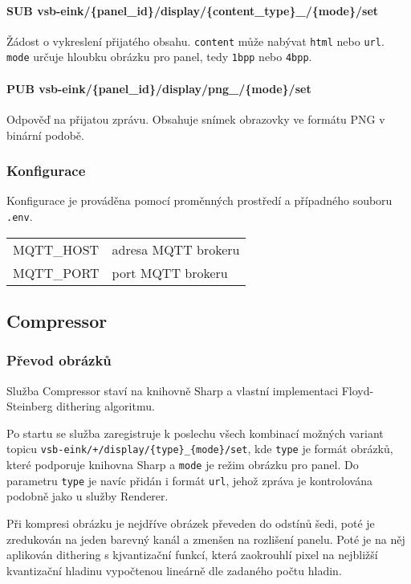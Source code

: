 \paragraph*{SUB vsb-eink/\{panel\_id\}/display/\{content\_type\}\_/\{mode\}/set} Žádost o vykreslení přijatého obsahu. \lstinline|content| může nabývat \lstinline|html| nebo \lstinline|url|. \lstinline|mode| určuje hloubku obrázku pro panel, tedy \lstinline|1bpp| nebo \lstinline|4bpp|.

\paragraph*{PUB vsb-eink/\{panel\_id\}/display/png\_/\{mode\}/set} Odpověď na přijatou zprávu. Obsahuje snímek obrazovky ve formátu PNG v binární podobě.

\subsubsection{Konfigurace}
Konfigurace je prováděna pomocí proměnných prostředí a případného souboru \lstinline{.env}.
\begin{table}[h]
    \begin{tabular}{ll}
        MQTT\_HOST & adresa MQTT brokeru \\
        MQTT\_PORT & port MQTT brokeru \\
    \end{tabular}
\end{table}

\subsection{Compressor}
\subsubsection{Převod obrázků}
Služba Compressor staví na knihovně Sharp \cite{fullerLovellSharp2024} a vlastní implementaci Floyd-Steinberg dithering algoritmu.

Po startu se služba zaregistruje k poslechu všech kombinací možných variant topicu \lstinline|vsb-eink/+/display/{type}_{mode}/set|, kde \lstinline|type| je formát obrázků, které podporuje knihovna Sharp a \lstinline|mode| je režim obrázku pro panel. Do parametru \lstinline|type| je navíc přidán i formát \lstinline|url|, jehož zpráva je kontrolována podobně jako u služby Renderer.

Při kompresi obrázku je nejdříve obrázek převeden do odstínů šedi, poté je zredukován na jeden barevný kanál a zmenšen na rozlišení panelu. Poté je na něj aplikován dithering s kjvantizační funkcí, která zaokrouhlí pixel na nejbližší kvantizační hladinu vypočtenou lineárně dle zadaného počtu hladin.

